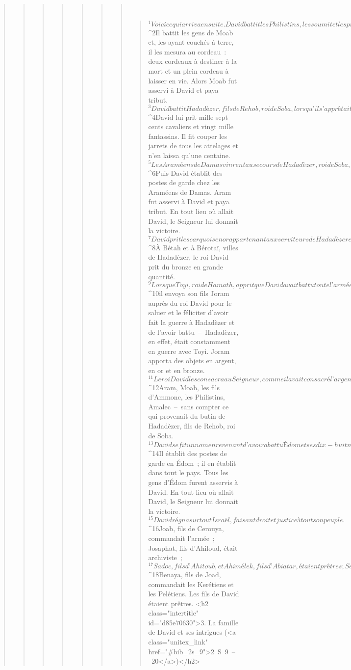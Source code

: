 \begin{verse}
\begin{verse}
\begin{verse}
\begin{verse}
\begin{verse}
\begin{verse}
\begin{verse}
         
      \bchapter{}
      \begin{verse}
${}^{1}Voici ce qui arriva ensuite. David battit les Philistins, les soumit et les priva de leur hégémonie. 
${}^{2}Il battit les gens de Moab et, les ayant couchés à terre, il les mesura au cordeau : deux cordeaux à destiner à la mort et un plein cordeau à laisser en vie. Alors Moab fut asservi à David et paya tribut.
${}^{3}David battit Hadadèzer, fils de Rehob, roi de Soba, lorsqu’il s’apprêtait à rétablir son pouvoir sur l’Euphrate. 
${}^{4}David lui prit mille sept cents cavaliers et vingt mille fantassins. Il fit couper les jarrets de tous les attelages et n’en laissa qu’une centaine. 
${}^{5}Les Araméens de Damas vinrent au secours de Hadadèzer, roi de Soba, mais David battit vingt-deux mille hommes parmi les Araméens. 
${}^{6}Puis David établit des postes de garde chez les Araméens de Damas. Aram fut asservi à David et paya tribut. En tout lieu où allait David, le Seigneur lui donnait la victoire. 
${}^{7}David prit les carquois en or appartenant aux serviteurs de Hadadèzer et les emporta à Jérusalem. 
${}^{8}À Bétah et à Bérotaï, villes de Hadadèzer, le roi David prit du bronze en grande quantité.
${}^{9}Lorsque Toyi, roi de Hamath, apprit que David avait battu toute l’armée de Hadadèzer, 
${}^{10}il envoya son fils Joram auprès du roi David pour le saluer et le féliciter d’avoir fait la guerre à Hadadèzer et de l’avoir battu – Hadadèzer, en effet, était constamment en guerre avec Toyi. Joram apporta des objets en argent, en or et en bronze. 
${}^{11}Le roi David les consacra au Seigneur, comme il avait consacré l’argent et l’or venant de toutes les nations qu’il avait assujetties : 
${}^{12}Aram, Moab, les fils d’Ammone, les Philistins, Amalec – sans compter ce qui provenait du butin de Hadadèzer, fils de Rehob, roi de Soba.
${}^{13}David se fit un nom en revenant d’avoir abattu Édom et ses dix-huit mille hommes, dans la vallée du Sel. 
${}^{14}Il établit des postes de garde en Édom ; il en établit dans tout le pays. Tous les gens d’Édom furent asservis à David. En tout lieu où allait David, le Seigneur lui donnait la victoire.
${}^{15}David régna sur tout Israël, faisant droit et justice à tout son peuple. 
${}^{16}Joab, fils de Cerouya, commandait l’armée ; Josaphat, fils d’Ahiloud, était archiviste ; 
${}^{17}Sadoc, fils d’Ahitoub, et Ahimélek, fils d’Abiatar, étaient prêtres ; Seraya était secrétaire ; 
${}^{18}Benaya, fils de Joad, commandait les Kerétiens et les Pelétiens. Les fils de David étaient prêtres.
      <h2 class="intertitle" id="d85e70630">3. La famille de David et ses intrigues (<a class="unitex_link" href="#bib_2s_9">2 S 9 – 20</a>)</h2>
      

\end{verse}
\end{verse}
\end{verse}
\end{verse}
\end{verse}
\end{verse}
\end{verse}
\end{verse}
